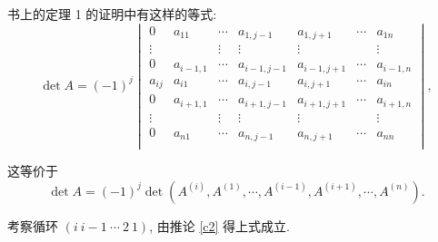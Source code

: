 \documentclass{ctexart}
\begin{document}
书上的定理 1 的证明中有这样的等式:
\[\det A=(-1)^j\begin{vmatrix}
    0 & a_{11} & \cdots & a_{1,j-1} & a_{1,j+1} & \cdots & a_{1n} \\
    \vdots && \vdots & \vdots & \vdots && \vdots \\
    0 & a_{i-1,1} & \cdots & a_{i-1,j-1} & a_{i-1,j+1} & \cdots & a_{i-1,n} \\
    a_{ij} & a_{i1} & \cdots & a_{i,j-1} & a_{i,j+1} & \cdots & a_{in} \\
    0 & a_{i+1,1} & \cdots & a_{i+1,j-1} & a_{i+1,j+1} & \cdots & a_{i+1,n} \\
    \vdots && \vdots & \vdots & \vdots && \vdots \\
    0 & a_{n1} & \cdots & a_{n,j-1} & a_{n,j+1} & \cdots & a_{nn} \\
\end{vmatrix},\]

这等价于
\[\det A=(-1)^j\det(A^{(i)},A^{(1)},\cdots,A^{(i-1)},A^{(i+1)},\cdots,A^{(n)}).\]

考察循环 $(i\ i-1\ \cdots\ 2\ 1)$, 由推论 \ref{c2} 得上式成立.
\end{document}
